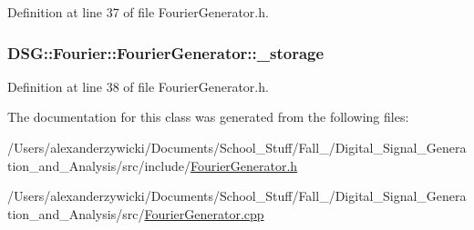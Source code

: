 Definition at line 37 of file Fourier\-Generator.\-h.

\hypertarget{classDSG_1_1Fourier_1_1FourierGenerator_a43799227375e2d8b1354682e3a4fc935}{
\subsubsection[{\-\_\-storage}]{ D\-S\-G\-::\-Fourier\-::\-Fourier\-Generator\-::\-\_\-storage\hspace{0.3cm}{\ttfamily [protected]}}}\label{classDSG_1_1Fourier_1_1FourierGenerator_a43799227375e2d8b1354682e3a4fc935}


Definition at line 38 of file Fourier\-Generator.\-h.



The documentation for this class was generated from the following files\-:\begin{DoxyCompactItemize}
\item 
/\-Users/alexanderzywicki/\-Documents/\-School\-\_\-\-Stuff/\-Fall\-\_/\-Digital\-\_\-\-Signal\-\_\-\-Generation\-\_\-and\-\_\-\-Analysis/src/include/\hyperlink{FourierGenerator_8h}{Fourier\-Generator.\-h}\item 
/\-Users/alexanderzywicki/\-Documents/\-School\-\_\-\-Stuff/\-Fall\-\_/\-Digital\-\_\-\-Signal\-\_\-\-Generation\-\_\-and\-\_\-\-Analysis/src/\hyperlink{FourierGenerator_8cpp}{Fourier\-Generator.\-cpp}\end{DoxyCompactItemize}
